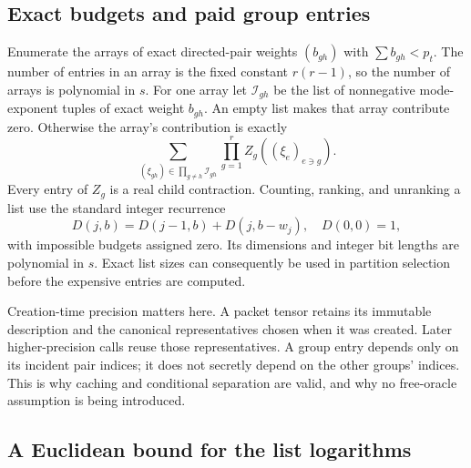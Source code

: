 \documentclass[11pt,letterpaper]{article}
\theoremstyle{remark}\newtheorem{remark}[theorem]{Remark}
\begin{document}
\subsection{Exact budgets and paid group entries}

Enumerate the arrays of exact directed-pair weights $(b_{gh})$ with
$\sum b_{gh}<p_t$. The number of entries in an array is the fixed constant
$r(r-1)$, so the number of arrays is polynomial in $s$. For one array let
$\mathcal I_{gh}$ be the list of nonnegative mode-exponent tuples of exact
weight $b_{gh}$. An empty list makes that array contribute zero. Otherwise
the array's contribution is exactly
\begin{equation}\label{eq:factor-graph}
 \sum_{(\xi_{gh})\in\prod_{g\ne h}\mathcal I_{gh}}
     \prod_{g=1}^r Z_g((\xi_e)_{e\ni g}).
\end{equation}
Every entry of $Z_g$ is a real child contraction. Counting, ranking, and
unranking a list use the standard integer recurrence
\[
 D(j,b)=D(j-1,b)+D(j,b-w_j),\quad D(0,0)=1,
\]
with impossible budgets assigned zero. Its dimensions and integer bit
lengths are polynomial in $s$. Exact list sizes can consequently be used
in partition selection before the expensive entries are computed.

Creation-time precision matters here. A packet tensor retains its immutable
description and the canonical representatives chosen when it was created.
Later higher-precision calls reuse those representatives. A group entry
depends only on its incident pair indices; it does not secretly depend on
the other groups' indices. This is why caching and conditional separation
are valid, and why no free-oracle assumption is being introduced.

\subsection{A Euclidean bound for the list logarithms}
\end{document}
